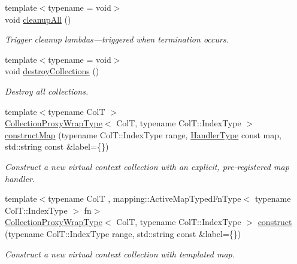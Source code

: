 \begin{DoxyCompactItemize}
{\footnotesize template$<$typename  = void$>$ }\\void \hyperlink{structvt_1_1vrt_1_1collection_1_1_collection_manager_a7d98e5aaa63d70cbabfbcf78a6cf503f}{cleanup\+All} ()
\begin{DoxyCompactList}\small\item\em Trigger cleanup lambdas---triggered when termination occurs. \end{DoxyCompactList}\item 
{\footnotesize template$<$typename  = void$>$ }\\void \hyperlink{structvt_1_1vrt_1_1collection_1_1_collection_manager_a71865b0508bab58b6d44b44416f11983}{destroy\+Collections} ()
\begin{DoxyCompactList}\small\item\em Destroy all collections. \end{DoxyCompactList}\item 
{\footnotesize template$<$typename ColT $>$ }\\\hyperlink{structvt_1_1vrt_1_1collection_1_1_collection_manager_a56458ed7f9bb22b631b9b3a745f42f94}{Collection\+Proxy\+Wrap\+Type}$<$ ColT, typename Col\+T\+::\+Index\+Type $>$ \hyperlink{structvt_1_1vrt_1_1collection_1_1_collection_manager_ac9e0c4bfb1865ebb014ca0dc4b9006f8}{construct\+Map} (typename Col\+T\+::\+Index\+Type range, \hyperlink{namespacevt_af64846b57dfcaf104da3ef6967917573}{Handler\+Type} const map, std\+::string const \&label=\{\})
\begin{DoxyCompactList}\small\item\em Construct a new virtual context collection with an explicit, pre-\/registered map handler. \end{DoxyCompactList}\item 
{\footnotesize template$<$typename ColT , mapping\+::\+Active\+Map\+Typed\+Fn\+Type$<$ typename Col\+T\+::\+Index\+Type $>$ fn$>$ }\\\hyperlink{structvt_1_1vrt_1_1collection_1_1_collection_manager_a56458ed7f9bb22b631b9b3a745f42f94}{Collection\+Proxy\+Wrap\+Type}$<$ ColT, typename Col\+T\+::\+Index\+Type $>$ \hyperlink{structvt_1_1vrt_1_1collection_1_1_collection_manager_a779338baed0f13c1e96b498560db9cbc}{construct} (typename Col\+T\+::\+Index\+Type range, std\+::string const \&label=\{\})
\begin{DoxyCompactList}\small\item\em Construct a new virtual context collection with templated map. \end{DoxyCompactList}\item 

\end{DoxyCompactItemize}
